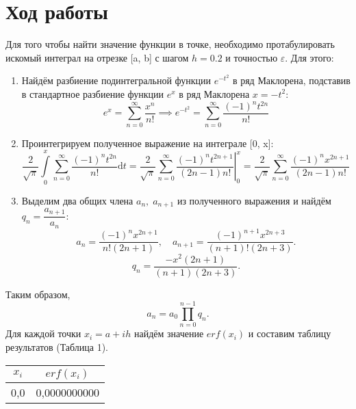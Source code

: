 \documentclass[a4paper,12pt]{article}
\begin{document}
{\section{Ход работы}
\hspace*{1.25cm}Для того чтобы найти значение функции в точке, необходимо протабулировать искомый интеграл на отрезке [a, b] с шагом $h = 0.2$ и точностью $\varepsilon$. Для этого:
\begin{enumerate}
    \item Найдём разбиение подинтегральной функции $e^{-t^2}$ в ряд Маклорена, подставив в стандартное разбиение функции $e^x$ в ряд Маклорена $x = -t^2$:
    \begin{equation}
        e^x = \sum_{n = 0}^{\infty}\frac{x^n}{n!} \implies e^{-t^2} = \sum_{n = 0}^{\infty}\frac{(-1)^n t^{2n}}{n!}
    \end{equation}
    \item Проинтегрируем полученное выражение на интеграле [0, x]:
    \begin{equation}
        \frac{2}{\sqrt{\pi}}\int\limits_{0}^{x}\sum_{n = 0}^{\infty}\frac{(-1)^n t^{2n}}{n!}\mathrm{d}t = \frac{2}{\sqrt{\pi}}\left.\sum_{n = 0}^{\infty}\frac{(-1)^n t^{2n+1}}{(2n-1)n!}\right|_{0}^{x} = \frac{2}{\sqrt{\pi}}\sum_{n = 0}^{\infty}\frac{(-1)^n x^{2n+1}}{(2n-1)n!}
    \end{equation}
    \item Выделим два общих члена $a_n, \; a_{n + 1}$ из полученного выражения и найдём\\ $q_n = \dfrac{a_{n+1}}{a_n}$:
    \begin{equation}
        a_{n}=\frac{(-1)^{n}x^{2n+1}}{n!(2n+1)}, \quad a_{n+1}=\frac{(-1)^{n+1}x^{2n+3}}{(n+1)!(2n+3)}.
    \end{equation}
    \begin{equation}
        q_{n}=\frac{-x^{2}(2n+1)}{(n+1)(2n+3)}.
    \end{equation}
\end{enumerate}
Таким образом,
\begin{equation}
	a_{n}=a_{0}\prod_{n=0}^{n-1} q_{n}.
\end{equation}
Для каждой точки $x_i = a + i  h$ найдём значение $erf(x_i)$ и составим таблицу результатов (Таблица 1).
\begin{table}[h]
    \centering
    \begin{tabular}{|c|c|}
        \hline
        $x_i$ & $erf(x_i)$\\
        \hline
        0,0 & 0,0000000000\\

\end{tabular}
\end{table}}
\end{document}
